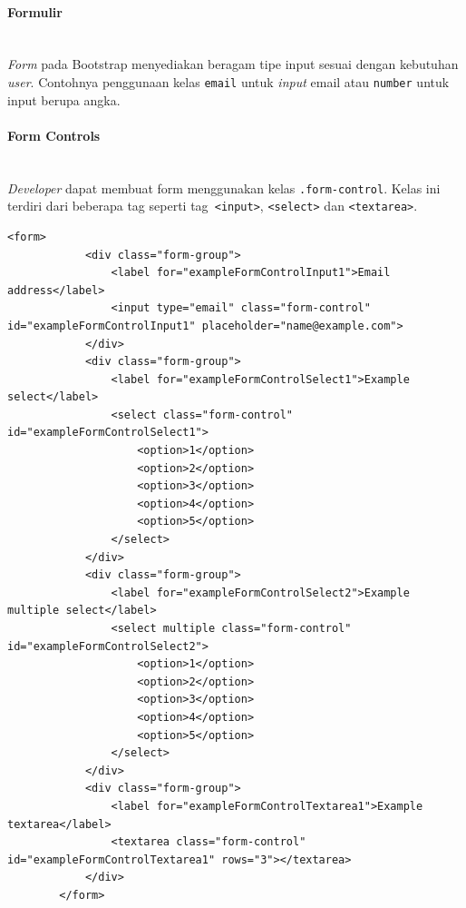 \documentclass[a4paper,twoside]{article}
\newcommand{\myparagraph}[1]{\paragraph{#1}\mbox{}\\}
\begin{document}
\begin{enumerate}
		
		
		\myparagraph{Formulir}
		\textit{Form} pada Bootstrap menyediakan beragam tipe input sesuai dengan kebutuhan \textit{user}. Contohnya penggunaan kelas \texttt{email} untuk \textit{input} email atau \texttt{number} untuk input berupa angka.
		\myparagraph{Form Controls}
		\textit{Developer} dapat membuat form menggunakan kelas \colorbox{mygray}{\texttt{.form-control}}. Kelas ini terdiri dari beberapa tag seperti tag\colorbox{mygray}{\texttt{ <input>}}, \colorbox{mygray}{\texttt{<select>}} dan \colorbox{mygray}{\texttt{<textarea>}}.
		\begin{lstlisting}[frame=single, basicstyle=\tiny] 
		<form>
			<div class="form-group">
				<label for="exampleFormControlInput1">Email address</label>
				<input type="email" class="form-control" id="exampleFormControlInput1" placeholder="name@example.com">
			</div>
			<div class="form-group">
				<label for="exampleFormControlSelect1">Example select</label>
				<select class="form-control" id="exampleFormControlSelect1">
					<option>1</option>
					<option>2</option>
					<option>3</option>
					<option>4</option>
					<option>5</option>
				</select>
			</div>
			<div class="form-group">
				<label for="exampleFormControlSelect2">Example multiple select</label>
				<select multiple class="form-control" id="exampleFormControlSelect2">
					<option>1</option>
					<option>2</option>
					<option>3</option>
					<option>4</option>
					<option>5</option>
				</select>
			</div>
			<div class="form-group">
				<label for="exampleFormControlTextarea1">Example textarea</label>
				<textarea class="form-control" id="exampleFormControlTextarea1" rows="3"></textarea>
			</div>
		</form>
		\end{lstlisting}
		

\end{enumerate}
\end{document}
